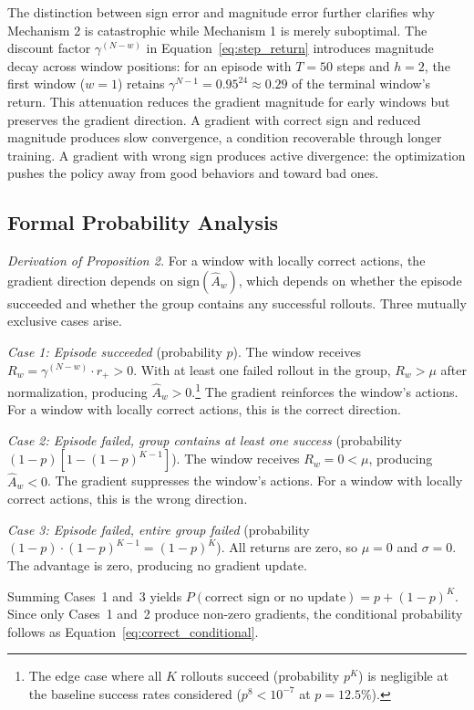 The distinction between sign error and magnitude error further clarifies why Mechanism 2 is catastrophic while Mechanism 1 is merely suboptimal. The discount factor $\gamma^{(N-w)}$ in Equation~\ref{eq:step_return} introduces magnitude decay across window positions: for an episode with $T=50$ steps and $h=2$, the first window ($w=1$) retains $\gamma^{N-1} = 0.95^{24} \approx 0.29$ of the terminal window's return. This attenuation reduces the gradient magnitude for early windows but preserves the gradient direction. A gradient with correct sign and reduced magnitude produces slow convergence, a condition recoverable through longer training. A gradient with wrong sign produces active divergence: the optimization pushes the policy away from good behaviors and toward bad ones.

\subsection{Formal Probability Analysis}
\label{app:formal_probability}

\textit{Derivation of Proposition 2.} For a window with locally correct actions, the gradient direction depends on $\text{sign}(\hat{A}_w)$, which depends on whether the episode succeeded and whether the group contains any successful rollouts. Three mutually exclusive cases arise.

\textit{Case 1: Episode succeeded} (probability $p$). The window receives $R_w = \gamma^{(N-w)} \cdot r_+ > 0$. With at least one failed rollout in the group, $R_w > \mu$ after normalization, producing $\hat{A}_w > 0$.\footnote{The edge case where all $K$ rollouts succeed (probability $p^K$) is negligible at the baseline success rates considered ($p^8 < 10^{-7}$ at $p = 12.5\%$).} The gradient reinforces the window's actions. For a window with locally correct actions, this is the correct direction.

\textit{Case 2: Episode failed, group contains at least one success} (probability $(1-p)[1 - (1-p)^{K-1}]$). The window receives $R_w = 0 < \mu$, producing $\hat{A}_w < 0$. The gradient suppresses the window's actions. For a window with locally correct actions, this is the wrong direction.

\textit{Case 3: Episode failed, entire group failed} (probability $(1-p) \cdot (1-p)^{K-1} = (1-p)^{K}$). All returns are zero, so $\mu = 0$ and $\sigma = 0$. The advantage is zero, producing no gradient update.

Summing Cases~1 and~3 yields $P(\text{correct sign or no update}) = p + (1-p)^{K}$. Since only Cases~1 and~2 produce non-zero gradients, the conditional probability follows as Equation~\ref{eq:correct_conditional}.

